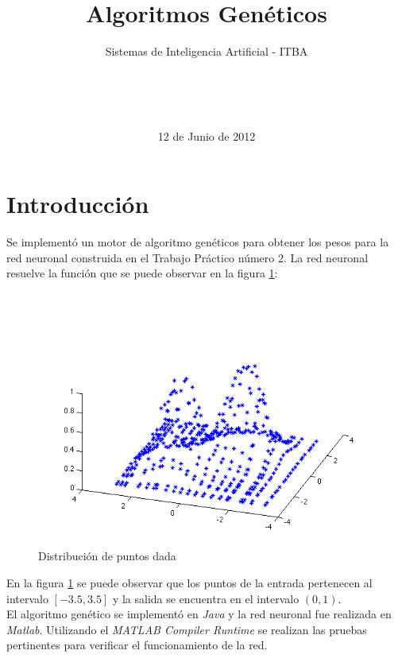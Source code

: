 \documentclass{sig-alternate}
\begin{document}

\title{Algoritmos Genéticos}
\subtitle{Sistemas de Inteligencia Artificial - ITBA}


\author{
	\\
	\\
	\\	
}

\date{12 de Junio de 2012}

\maketitle

\section{Introducción}

	Se implementó un motor de algoritmo genéticos para obtener los pesos para la red neuronal construida en el Trabajo Práctico número 2.
	La red neuronal resuelve la función que se puede observar en la figura \ref{fig:function}:

	\begin{figure}[!ht]
		\includegraphics[scale=0.5]{./figures/function.png}
  		\caption{Distribución de puntos dada}
  		\label{fig:function}
	\end{figure}

	En la figura \ref{fig:function} se puede observar que los puntos de la entrada pertenecen al intervalo $[-3.5, 3.5]$ y la salida se encuentra en el intervalo $(0, 1)$.\\
	El algoritmo genético se implementó en \textit{Java} y la red neuronal fue realizada en \textit{Matlab}. Utilizando el \textit{MATLAB Compiler Runtime} se realizan las pruebas pertinentes para verificar el funcionamiento de la red.\\
\end{document}
